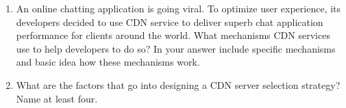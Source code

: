\documentclass{report}
\begin{document}
\clearpage
\begin{problem}

  \begin{enumerate}
  \item An online chatting application is going viral.
    To optimize user experience, its developers decided to use CDN service to deliver superb chat application performance for clients around the world.
    What mechanisms CDN services use to help developers to do so?
    In your answer include specific mechanisms and basic idea how these mechanisms work.

  \item What are the factors that go into designing a CDN server selection strategy? Name at least four.
  \end{enumerate}

\begin{answer}{24em}
\end{answer}

\end{problem}
\end{document}
